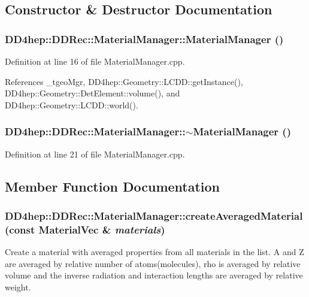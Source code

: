 \subsection{Constructor \& Destructor Documentation}
\hypertarget{class_d_d4hep_1_1_d_d_rec_1_1_material_manager_a7f32a7b551449b6143f56ba4a3f90c18}{
\subsubsection[{MaterialManager}]{\setlength{\rightskip}{0pt plus 5cm}DD4hep::DDRec::MaterialManager::MaterialManager ()}}
\label{class_d_d4hep_1_1_d_d_rec_1_1_material_manager_a7f32a7b551449b6143f56ba4a3f90c18}


Definition at line 16 of file MaterialManager.cpp.

References \_\-tgeoMgr, DD4hep::Geometry::LCDD::getInstance(), DD4hep::Geometry::DetElement::volume(), and DD4hep::Geometry::LCDD::world().\hypertarget{class_d_d4hep_1_1_d_d_rec_1_1_material_manager_a0251231cf063ba1b449c858b4b3a00a6}{
\subsubsection[{$\sim$MaterialManager}]{\setlength{\rightskip}{0pt plus 5cm}DD4hep::DDRec::MaterialManager::$\sim$MaterialManager ()}}
\label{class_d_d4hep_1_1_d_d_rec_1_1_material_manager_a0251231cf063ba1b449c858b4b3a00a6}


Definition at line 21 of file MaterialManager.cpp.

\subsection{Member Function Documentation}
\hypertarget{class_d_d4hep_1_1_d_d_rec_1_1_material_manager_a44243f88b984a698c8b823885c439702}{
\subsubsection[{createAveragedMaterial}]{ DD4hep::DDRec::MaterialManager::createAveragedMaterial (const {\bf MaterialVec} \& {\em materials})}}
\label{class_d_d4hep_1_1_d_d_rec_1_1_material_manager_a44243f88b984a698c8b823885c439702}
Create a material with averaged properties from all materials in the list. A and Z are averaged by relative number of atoms(molecules), rho is averaged by relative volume and the inverse radiation and interaction lengths are averaged by relative weight. 


